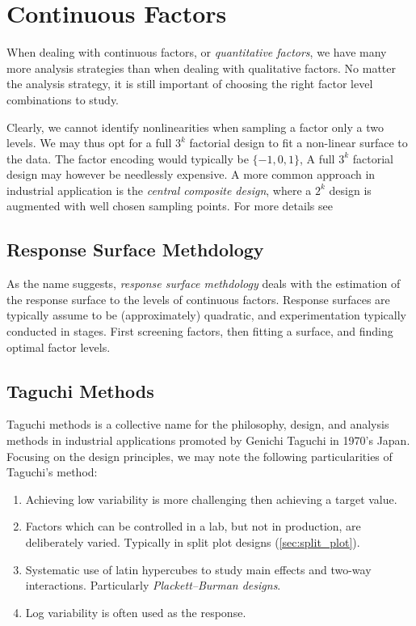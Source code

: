 \section{Continuous Factors}
When dealing with continuous factors, or \emph{quantitative factors}, we have many more analysis strategies than when dealing with qualitative factors.
No matter the analysis strategy, it is still important of choosing the right factor level combinations to study.

Clearly, we cannot identify nonlinearities when sampling a factor only a two levels.
We may thus opt for a full $3^k$ factorial design to fit a non-linear surface to the data.
The factor encoding would typically be $\{-1,0,1\}$,
A full $3^k$ factorial design may however be needlessly expensive. 
A more common approach in industrial application is the \emph{central composite design}, where a $2^k$ design is augmented with well chosen sampling points. 
For more details see \cite[Sec.6.6]{cox_theory_2000}


\subsection{Response Surface Methdology}
\label{sec:response_surface}
As the name suggests, \emph{response surface methdology} deals with the estimation of the response surface to the levels of continuous factors.
Response surfaces are typically assume to be (approximately) quadratic, and experimentation typically conducted in stages. First screening factors, then fitting a surface, and finding optimal factor levels.



\subsection{Taguchi Methods}
Taguchi methods is a collective name for the philosophy, design, and analysis methods in industrial applications promoted by Genichi Taguchi in 1970's Japan.
Focusing on the design principles, we may note the following particularities of Taguchi's method:
\begin{enumerate}
\item Achieving low variability is more challenging then achieving a target value. 
\item Factors which can be controlled in a lab, but not in production, are deliberately varied. Typically in split plot  designs (\ref{sec:split_plot}).
\item Systematic use of latin hypercubes to study main effects and two-way interactions. Particularly \emph{Plackett–Burman designs}.
\item Log variability is often used as the response.
\end{enumerate}





